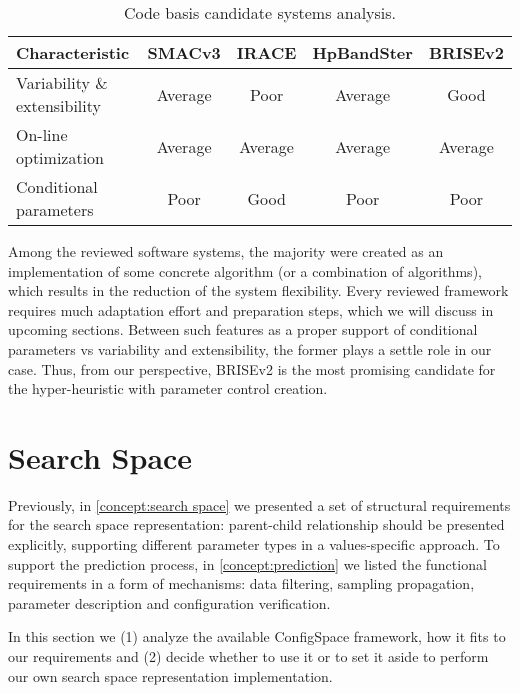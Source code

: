 \begin{table}[h!]
	\centering
	\begin{tabular}{l||cccc}
		\textbf{Characteristic} & \textbf{SMACv3}& \textbf{IRACE} & \textbf{HpBandSter} & \textbf{BRISEv2} \\
		\hline
		\hline
		Variability \& extensibility & \cellcolor{yellow!25}Average & \cellcolor{red!25}Poor & \cellcolor{yellow!25}Average & \cellcolor{green!25}Good \\
	
		On-line optimization & \cellcolor{yellow!25}Average & \cellcolor{yellow!25}Average & \cellcolor{yellow!25}Average & \cellcolor{yellow!25}Average \\
	
		Conditional parameters & \cellcolor{red!25}Poor & \cellcolor{green!25}Good & \cellcolor{red!25}Poor & \cellcolor{red!25}Poor \\
	\end{tabular}
	\caption{Code basis candidate systems analysis.}
	\label{iml: table code basis selection}
\end{table}

Among the reviewed software systems, the majority were created as an implementation of some concrete algorithm (or a combination of algorithms), which results in the reduction of the system flexibility. Every reviewed framework requires much adaptation effort and preparation steps, which we will discuss in upcoming sections. Between such features as a proper support of conditional parameters vs variability and extensibility, the former plays a settle role in our case. Thus, from our perspective, BRISEv2 is the most promising candidate for the hyper-heuristic with parameter control creation.

\section{Search Space}\label{impl: search space}
Previously, in \cref{concept:search space} we presented a set of structural requirements for the search space representation: parent-child relationship should be presented explicitly, supporting different parameter types in a values-specific approach. To support the prediction process, in \cref{concept:prediction} we listed the functional requirements in a form of mechanisms: data filtering, sampling propagation, parameter description and configuration verification.

In this section we (1) analyze the available ConfigSpace framework, how it fits to our requirements and (2) decide whether to use it or to set it aside to perform our own search space representation implementation.

